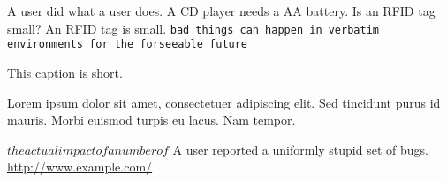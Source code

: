 \begin{comment}
some bad stuff that is in the comment environment and should be ignored.
we we
behavior
fashion
\end{comment}
A user did what a user does.  %
A CD player needs a AA battery.  %
Is an RFID tag small?
An RFID tag is small.
\verb+bad things can happen in verbatim environments for the forseeable future+
\caption{This caption is short.}
\caption[Lorem ipsum.]{Lorem ipsum dolor sit amet, consectetuer adipiscing elit. Sed tincidunt purus id mauris. Morbi euismod turpis eu lacus. Nam tempor.}
$the actual impact of a number of$ %
A user reported a uniformly stupid set of bugs.
\url{http://www.example.com/}
